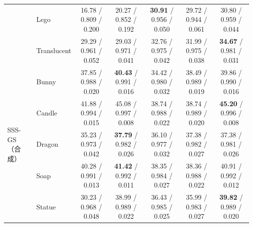 \begin{table}[t]
\begin{tabular}{@{}llccccc@{}}
 & Lego & 16.78 / 0.809 / 0.200 & 20.27 / 0.852 / 0.192 & \textbf{30.91} / 0.956 / 0.050 & 29.72 / 0.944 / 0.061 & 30.80 / 0.959 / 0.044 \\
 & Translucent & 29.29 / 0.961 / 0.052 & 29.03 / 0.971 / 0.041 & 32.76 / 0.975 / 0.042 & 31.99 / 0.975 / 0.038 & \textbf{34.67} / 0.981 / 0.031 \\
\midrule
\multirow{5}{*}{SSS-GS（合成）} & Bunny & 37.85 / 0.988 / 0.020 & \textbf{40.43} / 0.991 / 0.016 & 34.42 / 0.980 / 0.032 & 38.49 / 0.989 / 0.019 & 39.86 / 0.990 / 0.016 \\
 & Candle & 41.88 / 0.994 / 0.015 & 45.08 / 0.997 / 0.008 & 38.74 / 0.988 / 0.022 & 38.74 / 0.989 / 0.020 & \textbf{45.20} / 0.996 / 0.008 \\
 & Dragon & 35.23 / 0.973 / 0.042 & \textbf{37.79} / 0.982 / 0.026 & 36.10 / 0.977 / 0.032 & 37.38 / 0.982 / 0.027 & 37.38 / 0.981 / 0.026 \\
 & Soap & 40.28 / 0.991 / 0.013 & \textbf{41.42} / 0.992 / 0.011 & 38.35 / 0.984 / 0.027 & 38.36 / 0.988 / 0.022 & 40.91 / 0.992 / 0.012 \\
 & Statue & 30.23 / 0.968 / 0.048 & 38.99 / 0.989 / 0.022 & 36.43 / 0.985 / 0.025 & 35.99 / 0.983 / 0.027 & \textbf{39.82} / 0.989 / 0.020 \\
\bottomrule
\end{tabular}
\end{table}
